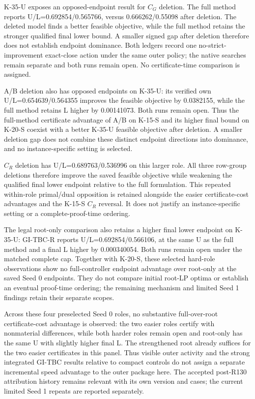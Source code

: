 \documentclass[
  american,
  11pt,
]{article}
\begin{document}
K-35-U exposes an opposed-endpoint result for \(C_G\) deletion. The full
method reports U/L=0.692854/0.565766, versus 0.666262/0.55098 after
deletion. The deleted model finds a better feasible objective, while the
full method retains the stronger qualified final lower bound. A smaller
signed gap after deletion therefore does not establish endpoint
dominance. Both ledgers record one no-strict-improvement exact-close
action under the same outer policy; the native searches remain separate
and both runs remain open. No certificate-time comparison is assigned.

A/B deletion also has opposed endpoints on K-35-U: its verified own
U/L=0.654639/0.564355 improves the feasible objective by 0.0382155,
while the full method retains L higher by 0.00141073. Both runs remain
open. Thus the full-method certificate advantage of A/B on K-15-S and
its higher final bound on K-20-S coexist with a better K-35-U feasible
objective after deletion. A smaller deletion gap does not combine these
distinct endpoint directions into dominance, and no instance-specific
setting is selected.

\(C_R\) deletion has U/L=0.689763/0.536996 on this larger role. All
three row-group deletions therefore improve the saved feasible objective
while weakening the qualified final lower endpoint relative to the full
formulation. This repeated within-role primal/dual opposition is
retained alongside the easier certificate-cost advantages and the K-15-S
\(C_R\) reversal. It does not justify an instance-specific setting or a
complete-proof-time ordering.

The legal root-only comparison also retains a higher final lower
endpoint on K-35-U: GI-TBC-R reports U/L=0.692854/0.566106, at the same
U as the full method and a final L higher by 0.000340054. Both runs
remain open under the matched complete cap. Together with K-20-S, these
selected hard-role observations show no full-controller endpoint
advantage over root-only at the saved Seed 0 endpoints. They do not
compare initial root-LP optima or establish an eventual proof-time
ordering; the remaining mechanism and limited Seed 1 findings retain
their separate scopes.

Across these four preselected Seed 0 roles, no substantive
full-over-root certificate-cost advantage is observed: the two easier
roles certify with nonmaterial differences, while both harder roles
remain open and root-only has the same U with slightly higher final L.
The strengthened root already suffices for the two easier certificates
in this panel. Thus visible outer activity and the strong integrated
GI-TBC results relative to compact controls do not assign a separate
incremental speed advantage to the outer package here. The accepted
post-R130 attribution history remains relevant with its own version and
cases; the current limited Seed 1 repeats are reported separately.
\end{document}
